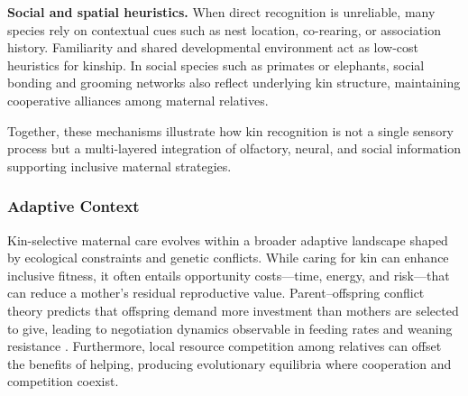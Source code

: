         \textbf{Social and spatial heuristics.}  When direct recognition is unreliable, many species rely on contextual cues such as nest location, co-rearing, or association history.  Familiarity and shared developmental environment act as low-cost heuristics for kinship.  In social species such as primates or elephants, social bonding and grooming networks also reflect underlying kin structure, maintaining cooperative alliances among maternal relatives.
        
        Together, these mechanisms illustrate how kin recognition is not a single sensory process but a multi-layered integration of olfactory, neural, and social information supporting inclusive maternal strategies.




        \subsubsection{Adaptive Context}
        Kin-selective maternal care evolves within a broader adaptive landscape shaped by ecological constraints and genetic conflicts.  While caring for kin can enhance inclusive fitness, it often entails opportunity costs—time, energy, and risk—that can reduce a mother’s residual reproductive value.  Parent–offspring conflict theory predicts that offspring demand more investment than mothers are selected to give, leading to negotiation dynamics observable in feeding rates and weaning resistance \cite{kol liker2015}.  Furthermore, local resource competition among relatives can offset the benefits of helping, producing evolutionary equilibria where cooperation and competition coexist.  

